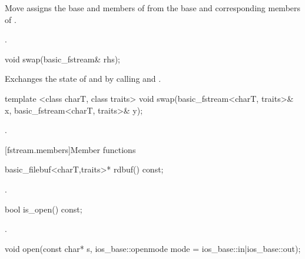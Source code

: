 \begin{itemdescr}
\pnum
\effects Move assigns the base and members of  from the base and corresponding
members of .

\pnum
\returns {}.
\end{itemdescr}

%
%
\begin{itemdecl}
void swap(basic_fstream& rhs);
\end{itemdecl}

\begin{itemdescr}
\pnum
\effects Exchanges the state of 
and  by calling
 and
.
\end{itemdescr}

%
%
\begin{itemdecl}
template <class charT, class traits>
void swap(basic_fstream<charT, traits>& x,
          basic_fstream<charT, traits>& y);
\end{itemdecl}

\begin{itemdescr}
\pnum
\effects {}.
\end{itemdescr}

[fstream.members]{Member functions}

%
\begin{itemdecl}
basic_filebuf<charT,traits>* rdbuf() const;
\end{itemdecl}

\begin{itemdescr}
\pnum
\returns
{}.
\end{itemdescr}

%
\begin{itemdecl}
bool is_open() const;
\end{itemdecl}

\begin{itemdescr}
\pnum
\returns
{}.
\end{itemdescr}

%
\begin{itemdecl}
void open(const char* s,
    ios_base::openmode mode = ios_base::in|ios_base::out);
\end{itemdecl}

